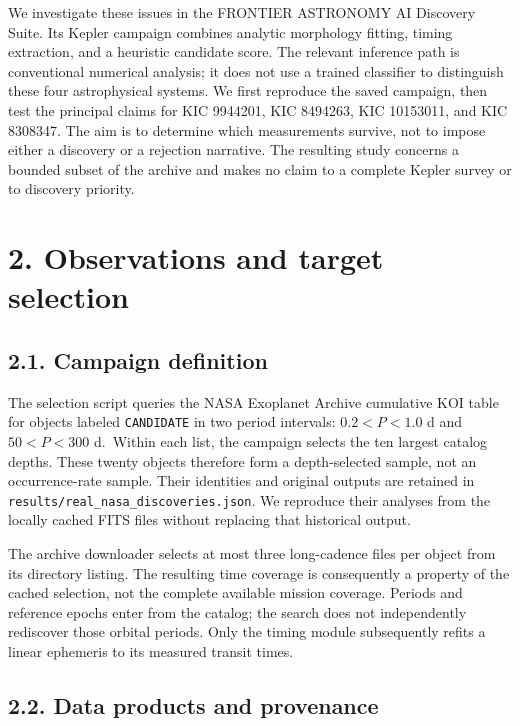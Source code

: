\documentclass[
  english,
]{article}
\begin{document}
We investigate these issues in the FRONTIER ASTRONOMY AI Discovery
Suite. Its Kepler campaign combines analytic morphology fitting, timing
extraction, and a heuristic candidate score. The relevant inference path
is conventional numerical analysis; it does not use a trained classifier
to distinguish these four astrophysical systems. We first reproduce the
saved campaign, then test the principal claims for KIC 9944201, KIC
8494263, KIC 10153011, and KIC 8308347. The aim is to determine which
measurements survive, not to impose either a discovery or a rejection
narrative. The resulting study concerns a bounded subset of the archive
and makes no claim to a complete Kepler survey or to discovery priority.

\section{2. Observations and target
selection}\label{observations-and-target-selection}

\subsection{2.1. Campaign definition}\label{campaign-definition}

The selection script queries the NASA Exoplanet Archive cumulative KOI
table for objects labeled \texttt{CANDIDATE} in two period intervals:
\(0.2<P<1.0\) d and \(50<P<300\) d.~Within each list, the campaign
selects the ten largest catalog depths. These twenty objects therefore
form a depth-selected sample, not an occurrence-rate sample. Their
identities and original outputs are retained in
\texttt{results/real\_nasa\_discoveries.json}. We reproduce their
analyses from the locally cached FITS files without replacing that
historical output.

The archive downloader selects at most three long-cadence files per
object from its directory listing. The resulting time coverage is
consequently a property of the cached selection, not the complete
available mission coverage. Periods and reference epochs enter from the
catalog; the search does not independently rediscover those orbital
periods. Only the timing module subsequently refits a linear ephemeris
to its measured transit times.

\subsection{2.2. Data products and
provenance}\label{data-products-and-provenance}
\end{document}
